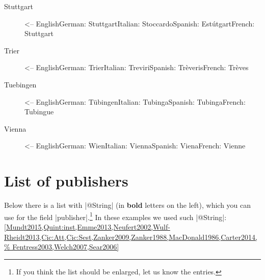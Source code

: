 \documentclass[a4paper,
10pt,
greek,
french,
spanish,
italian,
ngerman,
english
]{ltxdoc}
\begin{document}
\begin{multicols}{3}
\begin{description}
\item[Stuttgart] <-- English\newline German: Stuttgart\newline Italian: Stoccardo\newline Spanish: Estútgart\newline French: Stuttgart
\item[Trier] <-- English\newline German: Trier\newline Italian: Treviri\newline Spanish: Trèveris\newline French: Trèves
\item[Tuebingen] <-- English\newline German: Tübingen\newline Italian: Tubinga\newline Spanish: Tubinga\newline French: Tubingue
\item[Vienna] <-- English\newline German: Wien\newline Italian: Vienna\newline Spanish: Viena\newline French: Vienne

\end{description}
\end{multicols}
\section{List of publishers}\label{list-publishers}
Below there is a list with |@String| (in \textbf{bold} letters on the left), which you can use for the field |publisher|.\footnote{If you think the list should be enlarged, let us know the entries.}
In these examples we used such |@String|:
\cref{Mundt2015,Quint:inst,Emme2013,Neufert2002,Wulf-Rheidt2013,Cic:Att,Cic:Sest,Zanker2009,Zanker1988,MacDonald1986,Carter2014,%
Fentress2003,Welch2007,Sear2006}
\end{document}
